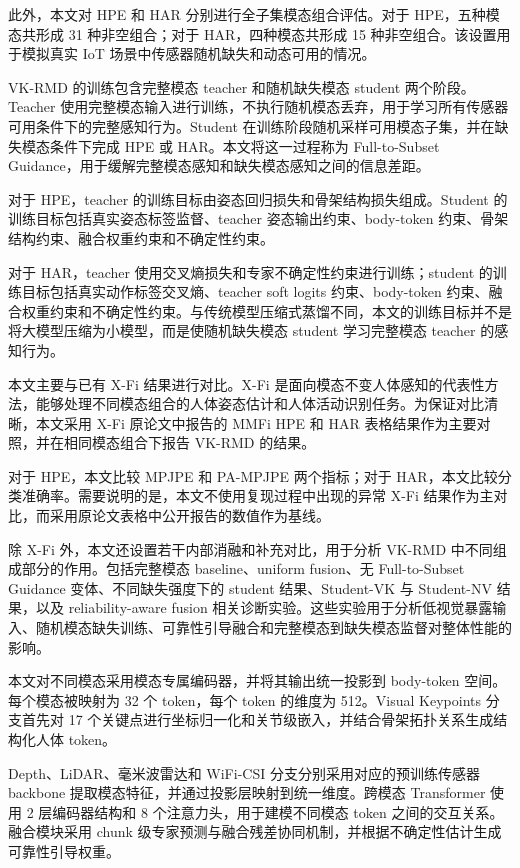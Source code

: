 \documentclass[journal]{IEEEtran}
\newcommand{\parahead}[1]{\vspace{0.4em}\noindent{\textbf{#1}}}
\begin{document}
此外，本文对 HPE 和 HAR 分别进行全子集模态组合评估。对于 HPE，五种模态共形成 31 种非空组合；对于 HAR，四种模态共形成 15 种非空组合。该设置用于模拟真实 IoT 场景中传感器随机缺失和动态可用的情况。

\parahead{训练目标。}
VK-RMD 的训练包含完整模态 teacher 和随机缺失模态 student 两个阶段。Teacher 使用完整模态输入进行训练，不执行随机模态丢弃，用于学习所有传感器可用条件下的完整感知行为。Student 在训练阶段随机采样可用模态子集，并在缺失模态条件下完成 HPE 或 HAR。本文将这一过程称为 Full-to-Subset Guidance，用于缓解完整模态感知和缺失模态感知之间的信息差距。

对于 HPE，teacher 的训练目标由姿态回归损失和骨架结构损失组成。Student 的训练目标包括真实姿态标签监督、teacher 姿态输出约束、body-token 约束、骨架结构约束、融合权重约束和不确定性约束。

对于 HAR，teacher 使用交叉熵损失和专家不确定性约束进行训练；student 的训练目标包括真实动作标签交叉熵、teacher soft logits 约束、body-token 约束、融合权重约束和不确定性约束。与传统模型压缩式蒸馏不同，本文的训练目标并不是将大模型压缩为小模型，而是使随机缺失模态 student 学习完整模态 teacher 的感知行为。

\parahead{对比方法。}
本文主要与已有 X-Fi 结果进行对比。X-Fi 是面向模态不变人体感知的代表性方法，能够处理不同模态组合的人体姿态估计和人体活动识别任务。为保证对比清晰，本文采用 X-Fi 原论文中报告的 MMFi HPE 和 HAR 表格结果作为主要对照，并在相同模态组合下报告 VK-RMD 的结果。

对于 HPE，本文比较 MPJPE 和 PA-MPJPE 两个指标；对于 HAR，本文比较分类准确率。需要说明的是，本文不使用复现过程中出现的异常 X-Fi 结果作为主对比，而采用原论文表格中公开报告的数值作为基线。

除 X-Fi 外，本文还设置若干内部消融和补充对比，用于分析 VK-RMD 中不同组成部分的作用。包括完整模态 baseline、uniform fusion、无 Full-to-Subset Guidance 变体、不同缺失强度下的 student 结果、Student-VK 与 Student-NV 结果，以及 reliability-aware fusion 相关诊断实验。这些实验用于分析低视觉暴露输入、随机模态缺失训练、可靠性引导融合和完整模态到缺失模态监督对整体性能的影响。

\parahead{实现细节。}
本文对不同模态采用模态专属编码器，并将其输出统一投影到 body-token 空间。每个模态被映射为 32 个 token，每个 token 的维度为 512。Visual Keypoints 分支首先对 17 个关键点进行坐标归一化和关节级嵌入，并结合骨架拓扑关系生成结构化人体 token。

Depth、LiDAR、毫米波雷达和 WiFi-CSI 分支分别采用对应的预训练传感器 backbone 提取模态特征，并通过投影层映射到统一维度。跨模态 Transformer 使用 2 层编码器结构和 8 个注意力头，用于建模不同模态 token 之间的交互关系。融合模块采用 chunk 级专家预测与融合残差协同机制，并根据不确定性估计生成可靠性引导权重。
\end{document}
